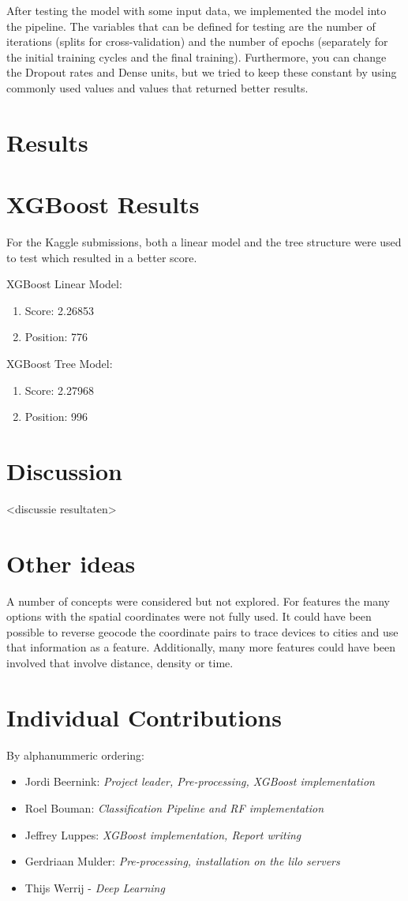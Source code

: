 \documentclass[runningheads,a4paper]{llncs}
\begin{document}
After testing the model with some input data, we implemented the model into the pipeline. The variables that can be defined for testing are the number of iterations (splits for cross-validation) and the number of epochs (separately for the initial training cycles and the final training). Furthermore, you can change the Dropout rates and Dense units, but we tried to keep these constant by using commonly used values and values that returned better results.

\section{Results}
\section{XGBoost Results}
For the Kaggle submissions, both a linear model and the tree structure were used to test which resulted in a better score.

XGBoost Linear Model:
\begin{enumerate}
    \item Score: 2.26853
    \item Position: 776
\end{enumerate}

XGBoost Tree Model:
\begin{enumerate}
     \item Score: 2.27968
    \item Position: 996   
\end{enumerate}
\section{Discussion}
<discussie resultaten>
\section{Other ideas}
A number of concepts were considered but not explored. For features the many options with the spatial coordinates were not fully used. It could have been possible to reverse geocode the coordinate pairs to trace devices to cities and use that information as a feature. Additionally, many more features could have been involved that involve distance, density or time. 

\section{Individual Contributions}
By alphanummeric ordering:
\begin{itemize}
\item Jordi Beernink: \textit{Project leader, Pre-processing, XGBoost implementation}
\item Roel Bouman: \textit{Classification Pipeline and RF implementation}
\item Jeffrey Luppes: \textit{XGBoost implementation, Report writing}
\item Gerdriaan Mulder: \textit{Pre-processing, installation on the lilo servers}
\item Thijs Werrij - \textit{Deep Learning}
\end{itemize}
\end{document}
